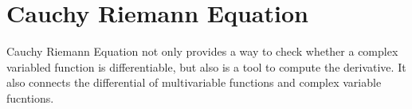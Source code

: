 \section{Cauchy Riemann Equation}

Cauchy Riemann Equation not only provides a way to check whether a complex variabled function is differentiable, but also is a tool to compute the derivative. It also connects the differential of multivariable functions and complex variable fucntions.